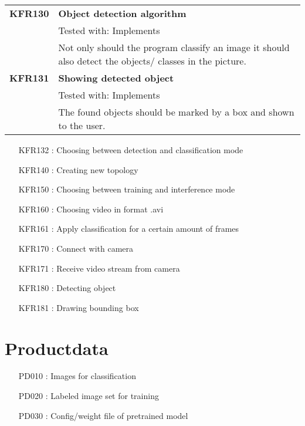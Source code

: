 \documentclass[parskip=full]{scrartcl}
\begin{document}
\begin{tabular}{p{2cm}p{12cm}}
\textbf {KFR130} & \textbf{Object detection algorithm} \\
& Tested with: Implements\\
& Not only should the program classify an image it should also detect the objects/ classes in the picture. \\
\textbf {KFR131} & \textbf{Showing detected object} \\
& Tested with: Implements\\
& The found objects should be marked by a box and shown to the user. \\

\end{tabular}
\begin{itemize}[nosep]
\item [KFR132]: Choosing between detection and classification mode
\item [KFR140]: Creating new topology
\item [KFR150]: Choosing between training and interference mode
\item [KFR160]: Choosing video in format .avi
\item [KFR161]: Apply classification for a certain amount of frames
\item [KFR170]: Connect with camera 
\item [KFR171]: Receive video stream from camera
\item [KFR180]: Detecting object
\item [KFR181]: Drawing bounding box 

\end{itemize}

\section{Productdata}
\begin{itemize}[nosep]
\item [PD010]: Images for classification
\item [PD020]: Labeled image set for training
\item [PD030]: Config/weight file of pretrained model
\end{itemize}
\end{document}
